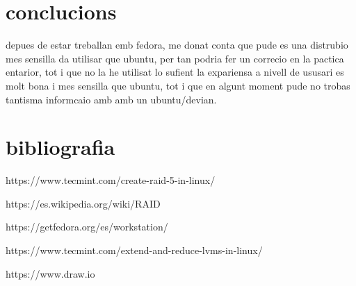 \documentclass[preprint,11pt]{elsarticle}
\begin{document}
\section{conclucions}
depues de estar treballan emb fedora, me donat conta que pude es una distrubio mes sensilla da utilisar que ubuntu, per tan podria fer un correcio en la pactica entarior, tot i que no la he utilisat lo sufient la expariensa a nivell de ususari es molt bona i mes sensilla que ubuntu, tot i que en algunt moment pude no trobas tantisma informcaio amb amb un ubuntu/devian.


\clearpage
\section{bibliografia}
https://www.tecmint.com/create-raid-5-in-linux/ \smallskip

https://es.wikipedia.org/wiki/RAID\smallskip

https://getfedora.org/es/workstation/\smallskip

https://www.tecmint.com/extend-and-reduce-lvms-in-linux/\smallskip

https://www.draw.io\smallskip
\end{document}
